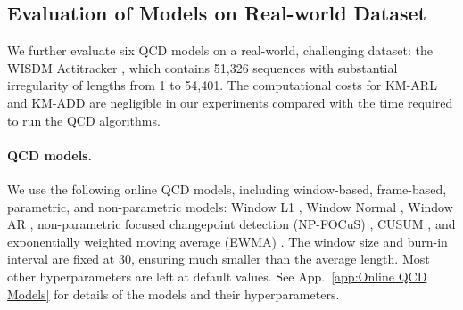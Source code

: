 \documentclass{article}
\theoremstyle{plain}
\theoremstyle{definition}
\theoremstyle{remark}
\begin{document}
\subsection{Evaluation of Models on Real-world Dataset} \label{sec:Evaluating QCD Models on Real-world Dataset} 
We further evaluate six QCD models on a real-world, challenging dataset: the WISDM Actitracker \citep{kwapisz2011activity_WISDM_Actitracker_dataset}, which contains 51,326 sequences with substantial irregularity of lengths from 1 to 54,401. 
The computational costs for KM-ARL and KM-ADD are negligible in our experiments compared with the time required to run the QCD algorithms.

\paragraph{QCD models.}
We use the following online QCD models, including window-based, frame-based, parametric, and non-parametric models: 
Window L1 \citep{bai1995least}, Window Normal \citep{lavielle1999detection, lavielle2006detection}, Window AR \citep{bai2000vector}, non-parametric focused changepoint detection (NP-FOCuS) \citep{NP_FOCuS}, CUSUM \citep{page1954continuous_CUSUM_org}, and exponentially weighted moving average (EWMA) \citep{roberts2000control_EWMA_org}.
The window size and burn-in interval are fixed at $30$, ensuring much smaller than the average length.
Most other hyperparameters are left at default values.
See App.~\ref{app:Online QCD Models} for details of the models and their hyperparameters.

\end{document}

